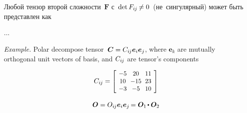 \begin{otherlanguage}{russian}

Любой тензор второй сложности~${\bm{F}}$ с~${\operatorname{det} F_{i\hspace{-0.1ex}j} \hspace{-0.16ex} \neq 0}$~(не~сингулярный) может быть представлен как

...

\begin{tcolorbox}
\small\setlength{\abovedisplayskip}{2pt}\setlength{\belowdisplayskip}{2pt}

\emph{Example.} Polar decompose tensor~${\bm{C} = C_{i\hspace{-0.1ex}j} \bm{e}_i \bm{e}_j}$, where $\bm{e}_k$ are mutually orthogonal unit vectors of basis, and $C_{i\hspace{-0.1ex}j}$ are tensor’s components

\begin{equation*}
C_{i\hspace{-0.1ex}j} =
\scalebox{0.92}[0.92]{$\left[\hspace{-0.2ex}\begin{array}{c@{\hspace{.6em}}c@{\hspace{.6em}}c}
-5 & 20 & 11 \\
10 & -15 & 23 \\
-3 & -5 & 10
\end{array}\hspace{-0.2ex}\right]$}
\end{equation*}

\begin{equation*}
\rotationtensor = O_{i\hspace{-0.1ex}j} \bm{e}_i \bm{e}_j \hspace{-0.2ex}
= \bm{O}_1 \hspace{-0.2ex} \dotp \bm{O}_2
\end{equation*}


\end{tcolorbox}
\end{otherlanguage}
